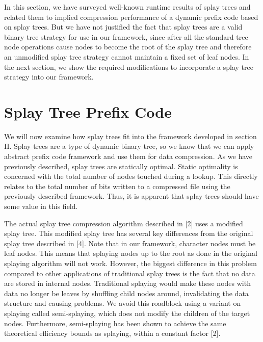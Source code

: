 \documentclass[twoside]{article}
\begin{document}
\begin{multicols}{2}
In this section, we have surveyed well-known runtime results of splay trees and related them to implied compression performance of a dynamic prefix code based on splay trees. But we have not justified the fact that splay trees are a valid binary tree strategy for use in our framework, since after all the standard tree node operations cause nodes to become the root of the splay tree and therefore an unmodified splay tree strategy cannot maintain a fixed set of leaf nodes. In the next section, we show the required modifications to incorporate a splay tree strategy into our framework.

\section{Splay Tree Prefix Code}


We will now examine how splay trees fit into the framework developed in section II. Splay trees are a type of dynamic binary tree, so we know that we can apply abstract prefix code framework and use them for data compression. As we have previously described, splay trees are statically optimal. Static optimality is concerned with the total number of nodes touched during a lookup. This directly relates to the total number of bits written to a compressed file using the previously described framework. Thus, it is apparent that splay trees should have some value in this field.

The actual splay tree compression algorithm described in [2] uses a modified splay tree. This modified splay tree has several key differences from the original splay tree described in [4]. Note that in our framework, character nodes must be leaf nodes. This means that splaying nodes up to the root as done in the original splaying algorithm will not work. However, the biggest difference in this problem compared to other applications of traditional splay trees is the fact that no data are stored in internal nodes. Traditional splaying would make these nodes with data no longer be leaves by shuffling child nodes around, invalidating the data structure and causing problems. We avoid this roadblock using a variant on splaying called semi-splaying, which does not modify the children of the target nodes. Furthermore, semi-splaying has been shown to achieve the same theoretical efficiency bounds as splaying, within a constant factor [2]. 


\end{multicols}
\end{document}
